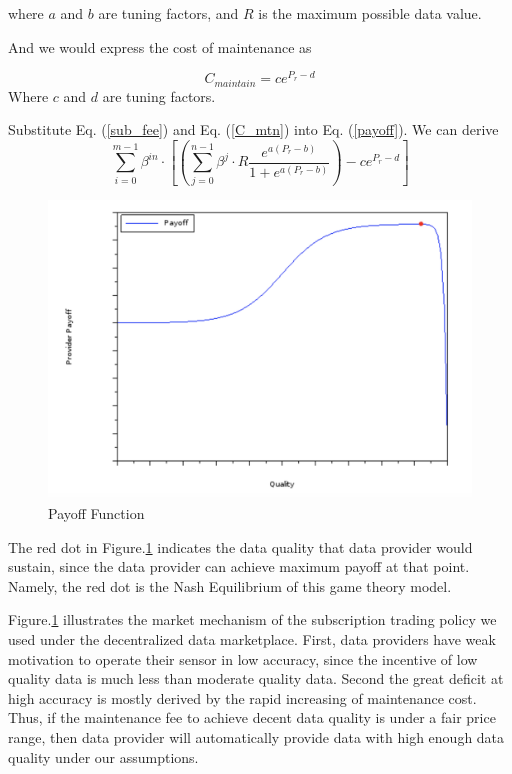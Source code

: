 \documentclass[journal,article,applsci,submit,moreauthors,pdftex]{Definitions/mdpi}
\begin{document}
where $a$ and $b$ are tuning factors, and $R$ is the maximum possible data value.

And we would express the cost of maintenance as

\begin{equation} \label{C_mtn}
    C_{maintain} = ce^{P_r - d}
\end{equation}
Where $c$ and $d$ are tuning factors.

Substitute Eq. (\ref{sub_fee}) and Eq. (\ref{C_mtn}) into Eq. (\ref{payoff}). We can derive
\begin{equation} \label{payoff_Pr}
    \sum_{i=0}^{m - 1}{\beta^{in}\cdot [(\sum_{j=0}^{n - 1} \beta^j \cdot R \frac{e^{a (P_r - b)}}{1 + e^{a (P_r - b)}}) - ce^{P_r - d}]}
\end{equation}

\begin{figure}[H] \centering \includegraphics[width=3.3 in]{payoff_pic} \caption{Payoff Function}
    \label{fig:payoff_pic} \end{figure}

The red dot in Figure.\ref{fig:payoff_pic} indicates the data quality that data provider would sustain, since the data provider can achieve maximum payoff at that point. Namely, the red dot is the Nash Equilibrium of this game theory model.

Figure.\ref{fig:payoff_pic} illustrates the market mechanism of the subscription trading policy we used under the decentralized data marketplace. First, data providers have weak motivation to operate their sensor in low accuracy, since the incentive of low quality data is much less than moderate quality data. Second the great deficit at high accuracy is mostly derived by the rapid increasing of maintenance cost. Thus, if the maintenance fee to achieve decent data quality is under a fair price range, then data provider will automatically provide data with high enough data quality under our assumptions.
\end{document}
